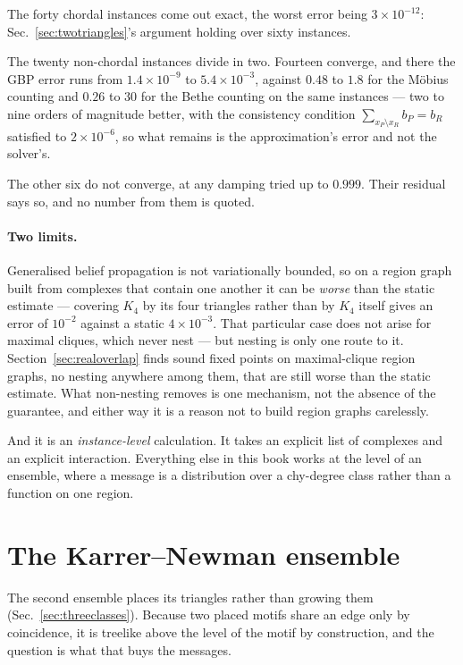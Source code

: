 The forty chordal instances come out exact, the worst error being
$3\times10^{-12}$: Sec.~\ref{sec:twotriangles}'s argument holding over sixty
instances.

The twenty non-chordal instances divide in two. Fourteen converge, and there the GBP error runs from
$1.4\times10^{-9}$ to $5.4\times10^{-3}$, against $0.48$ to $1.8$ for the
M\"obius counting and $0.26$ to $30$ for the Bethe counting on the same
instances --- two to nine orders of magnitude better, with the consistency
condition $\sum_{x_{P}\setminus x_{R}}b_{P}=b_{R}$ satisfied to
$2\times10^{-6}$, so what remains is the approximation's error and not the
solver's.

The other six do not converge, at any damping tried up to $0.999$. Their
residual says so, and no number from them is quoted.

\paragraph{Two limits.} Generalised belief propagation is not variationally bounded, so on a
region graph built from complexes that contain one another it can be
\emph{worse} than the static estimate --- covering $K_{4}$ by its four triangles
rather than by $K_{4}$ itself gives an error of $10^{-2}$ against a static
$4\times10^{-3}$. That particular case does not arise for maximal
cliques, which never nest --- but nesting is only one route to it.
Section~\ref{sec:realoverlap} finds sound fixed points on maximal-clique region
graphs, no nesting anywhere among them, that are still worse than the static
estimate. What non-nesting removes is one mechanism, not the absence of the
guarantee, and either way it is a reason not to build region graphs carelessly.

And it is an \emph{instance-level} calculation. It takes an explicit list of
complexes and an explicit interaction. Everything else in this book works at the
level of an ensemble, where a message is a distribution over a chy-degree class
rather than a function on one region.

\section{The Karrer--Newman ensemble}
\label{sec:karrer}

The second ensemble places its triangles rather than growing them
(Sec.~\ref{sec:threeclasses}). Because two placed motifs share an edge only by
coincidence, it is treelike above the level of the motif by construction, and
the question is what that buys the messages.

